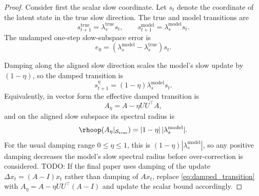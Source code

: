 \begin{proof}
Consider first the scalar slow coordinate. Let $s_t$ denote the coordinate of
the latent state in the true slow direction. The true and model transitions are
\begin{equation}
    s_{t+1}^{\mathrm{true}}
    =
    \lambda_s^{\mathrm{true}} s_t,
    \qquad
    s_{t+1}^{\mathrm{model}}
    =
    \lambda_s^{\mathrm{model}} s_t.
\end{equation}
The undamped one-step slow-subspace error is
\begin{equation}
    e_0
    =
    \left(
        \lambda_s^{\mathrm{model}}
        -
        \lambda_s^{\mathrm{true}}
    \right)s_t.
\end{equation}

Damping along the aligned slow direction scales the model's slow update by
$(1-\eta)$, so the damped transition is
\begin{equation}
    s_{t+1}^{\eta}
    =
    (1-\eta)\lambda_s^{\mathrm{model}}s_t.
\end{equation}
Equivalently, in vector form the effective damped transition is
\begin{equation}
    A_\eta = A - \eta U U^\top A,
    \label{eq:damped_transition}
\end{equation}
and on the aligned slow subspace its spectral radius is
\begin{equation}
    \rhoop(A_\eta|_{\mathcal{S}_{\mathrm{true}}})
    =
    |1-\eta|\,|\lambda_s^{\mathrm{model}}|.
\end{equation}
For the usual damping range $0 \leq \eta \leq 1$, this is
$(1-\eta)|\lambda_s^{\mathrm{model}}|$, so any positive damping decreases the
model's slow spectral radius before over-correction is considered.
TODO: If the final paper uses damping of the update
$\Delta x_t=(A-I)x_t$ rather than damping of $A x_t$, replace
\eqref{eq:damped_transition} with
$A_\eta=A-\eta U U^\top(A-I)$ and update the scalar bound accordingly.


\end{proof}
